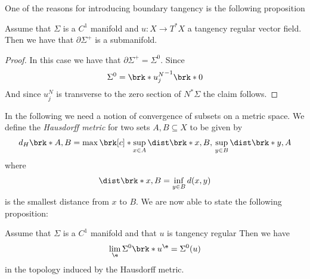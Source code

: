 One of the reasons for introducing boundary tangency is the following proposition 
\begin{proposition}
  Assume that $\Sigma$ is a $C^1$ manifold and $u\colon X\to T^*X$
  a tangency regular vector field. Then we have that
  $\partial\Sigma^+$ is a submanifold.
\end{proposition}
\begin{proof}
  In this case we have that $\partial\Sigma^+=\Sigma^0$.
  Since
  \begin{align}
    \Sigma^0=\brk*{u_j^N}^{-1}\brk*{0}
  \end{align}
  And since $u_j^N$ is transverse to the zero section of $N^*\Sigma$ the claim follows.
\end{proof}

In the following we need a notion of convergence of subsets on a metric space.
We define the \emph{Hausdorff metric} for two sets $A,B\subseteq X$ to be given by 
\begin{align}
  d_H\brk*{A,B}=\max\brk[c]*{\sup_{x\in A}\dist\brk*{x,B},\,\sup_{y\in B}\dist\brk*{y,A}}
\end{align}
where
\begin{align}
  \dist\brk*{x,B}=\inf_{y\in B}d(x,y)
\end{align}
is the smallest distance from $x$ to $B$.
We are now able to state the following proposition:
\begin{proposition}\label{pr:tanReg_convergence_Sigma0}
  Assume that $\Sigma$ is a $C^1$ manifold and that $u$ is tangency regular
  Then we have
  \begin{align}
    \lim_\e\Sigma^0\brk*{u^\e}=\Sigma^0(u)
  \end{align}
  in the topology induced by the Hausdorff metric.
\end{proposition}

